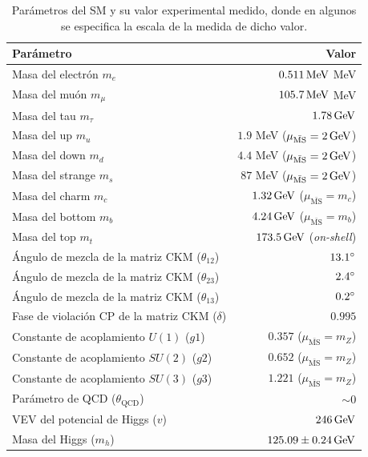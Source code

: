 \begin{table} 
	
	\centering
	\begin{tabular}{ l | r }

	\hline	
	\hline

		Parámetro & Valor \\

		\hline
		\hline

    Masa del electrón $m_e$ & $0.511\,\text{MeV}$ MeV \\
    Masa del muón $m_{\mu}$ & $105.7\,\text{MeV}$ MeV \\
    Masa del tau $m_{\tau}$ & $1.78\,\text{GeV}$ \\
    Masa del up $m_u$ & $1.9$ MeV ($\mu_{\bar{\text{MS}}}=2\,\text{GeV}$) \\
    Masa del down $m_d$ & $4.4$ MeV ($\mu_{\bar{\text{MS}}}=2\,\text{GeV}$) \\
    Masa del strange $m_s$ & $87$ MeV ($\mu_{\bar{\text{MS}}}=2\,\text{GeV}$) \\
    Masa del charm $m_c$ & $1.32\,\text{GeV}$ ($\mu_{\bar{\text{MS}}} = m_c$) \\
    Masa del bottom $m_b$ & $4.24\,\text{GeV}$ ($\mu_{\bar{\text{MS}}} = m_b$) \\
    Masa del top $m_t$ & $173.5\,\text{GeV}$ (\textit{on-shell})\\
    Ángulo de mezcla de la matriz CKM ($\theta_{12}$) & $13.1\degree$ \\
    Ángulo de mezcla de la matriz CKM ($\theta_{23}$) & $2.4\degree$ \\
    Ángulo de mezcla de la matriz CKM ($\theta_{13}$) & $0.2\degree$ \\
    Fase de violación CP de la matriz CKM ($\delta$) & $0.995$ \\
    Constante de acoplamiento $U(1)$ ($g1$) & $0.357$ ($\mu_{\bar{\text{MS}}} = m_Z$) \\
    Constante de acoplamiento $SU(2)$ ($g2$) & $0.652$ ($\mu_{\bar{\text{MS}}} = m_Z$) \\
    Constante de acoplamiento $SU(3)$ ($g3$) & $1.221$ ($\mu_{\bar{\text{MS}}} = m_Z$) \\
    Parámetro de QCD ($\theta_{\text{QCD}}$) & $\sim 0$ \\
    VEV del potencial de Higgs ($v$) & $246\,\text{GeV}$ \\
    Masa del Higgs ($m_h$) & $125.09\pm0.24\,\text{GeV}$ \\

    \hline
    \hline

	\end{tabular}
	\caption{Parámetros del SM y su valor experimental medido, donde en algunos se especifica la escala de la medida de dicho valor.}
	\label{tab:sm_para}
\end{table}


